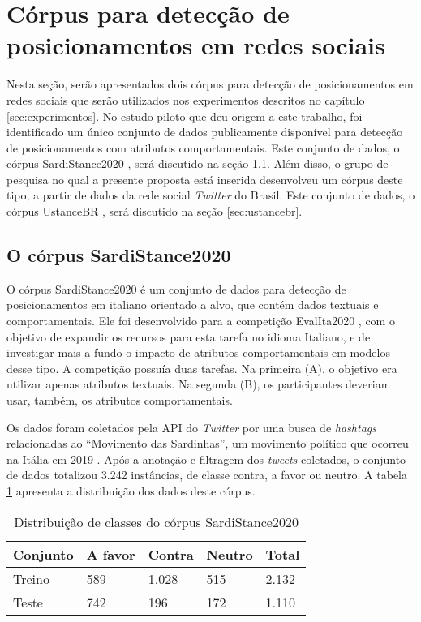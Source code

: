 \documentclass[
	12pt, oneside, a4paper, english, brazil
]{abntex2ppgsi}
\begin{document}
\section{Córpus para detecção de posicionamentos em redes sociais}
\label{sec:corpus}

Nesta seção, serão apresentados dois córpus para detecção de posicionamentos em redes sociais que serão utilizados nos experimentos descritos no capítulo \ref{sec:experimentos}. No estudo piloto que deu origem a este trabalho, foi identificado um único conjunto de dados publicamente disponível para detecção de posicionamentos com atributos comportamentais. Este conjunto de dados, o córpus SardiStance2020 \cite{cignarella2020}, será discutido na seção \ref{sec:sardistance}. Além disso, o grupo de pesquisa no qual a presente proposta está inserida desenvolveu um córpus deste tipo, a partir de dados da rede social {\em Twitter} do Brasil. Este conjunto de dados, o córpus UstanceBR \cite{ustancebr}, será discutido na seção \ref{sec:ustancebr}.

\subsection{O córpus SardiStance2020}
\label{sec:sardistance}
O córpus SardiStance2020 é um conjunto de dados para detecção de posicionamentos em italiano orientado a alvo, que contém dados textuais e comportamentais. Ele foi desenvolvido para a competição EvalIta2020 \cite{cignarella2020}, com o objetivo de expandir os recursos para esta tarefa no idioma Italiano, e de investigar mais a fundo o impacto de atributos comportamentais em modelos desse tipo. A competição possuía duas tarefas. Na primeira (A), o objetivo era utilizar apenas atributos textuais. Na segunda (B), os participantes deveriam usar, também, os atributos comportamentais.

Os dados foram coletados pela API do {\em Twitter} por uma busca de {\em hashtags} relacionadas ao ``Movimento das Sardinhas'', um movimento político que ocorreu na Itália em 2019 \cite{cignarella2020}. Após a anotação e filtragem dos {\em tweets} coletados, o conjunto de dados totalizou 3.242 instâncias, de classe contra, a favor ou neutro. A tabela \ref{tab:distribuicao-sardistance} apresenta a distribuição dos dados deste córpus.

\begin{table}[ht]
\centering
\caption{Distribuição de classes do córpus SardiStance2020}
\begin{tabular}{lllll}
\hline
Conjunto & A favor & Contra & Neutro & Total \\ \hline
Treino  & 589 & 1.028 & 515 & 2.132 \\
Teste  & 742 & 196 & 172 & 1.110 \\ \hline
\end{tabular}
\label{tab:distribuicao-sardistance}
\end{table}
\end{document}
